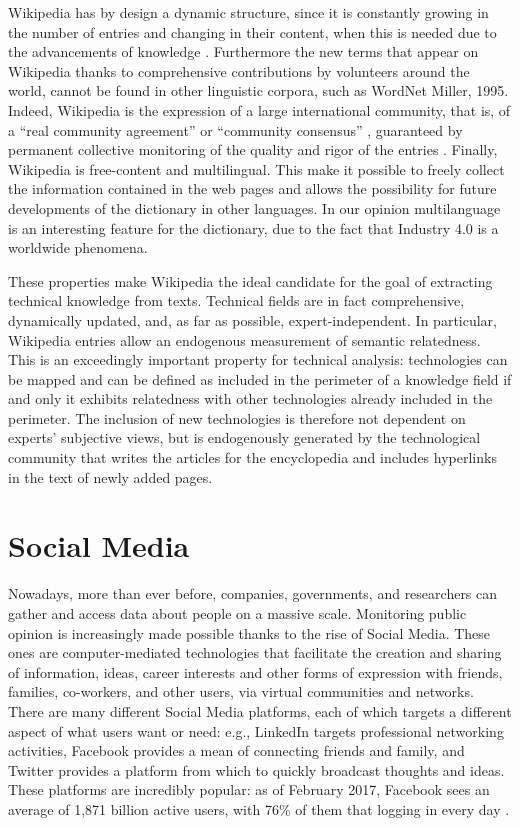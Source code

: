 \documentclass[]{book}
\begin{document}
Wikipedia has by design a dynamic structure, since it is constantly
growing in the number of entries and changing in their content, when
this is needed due to the advancements of knowledge
\citep{ponzetto2007knowledge}. Furthermore the new terms that appear on
Wikipedia thanks to comprehensive contributions by volunteers around the
world, cannot be found in other linguistic corpora, such as WordNet
Miller, 1995. Indeed, Wikipedia is the expression of a large
international community, that is, of a ``real community agreement''
\citep{bizer2009dbpedia} or ``community consensus''
\citep{hepp2007harvesting}, guaranteed by permanent collective
monitoring of the quality and rigor of the entries
\citep{bryant2005becoming}. Finally, Wikipedia is free-content and
multilingual. This make it possible to freely collect the information
contained in the web pages and allows the possibility for future
developments of the dictionary in other languages. In our opinion
multilanguage is an interesting feature for the dictionary, due to the
fact that Industry 4.0 is a worldwide phenomena.

These properties make Wikipedia the ideal candidate for the goal of
extracting technical knowledge from texts. Technical fields are in fact
comprehensive, dynamically updated, and, as far as possible,
expert-independent. In particular, Wikipedia entries allow an endogenous
measurement of semantic relatedness. This is an exceedingly important
property for technical analysis: technologies can be mapped and can be
defined as included in the perimeter of a knowledge field if and only it
exhibits relatedness with other technologies already included in the
perimeter. The inclusion of new technologies is therefore not dependent
on experts' subjective views, but is endogenously generated by the
technological community that writes the articles for the encyclopedia
and includes hyperlinks in the text of newly added pages.

\section{Social Media}\label{sotadocumentstwitter}

Nowadays, more than ever before, companies, governments, and researchers
can gather and access data about people on a massive scale. Monitoring
public opinion is increasingly made possible thanks to the rise of
Social Media. These ones are computer-mediated technologies that
facilitate the creation and sharing of information, ideas, career
interests and other forms of expression with friends, families,
co-workers, and other users, via virtual communities and networks. There
are many different Social Media platforms, each of which targets a
different aspect of what users want or need: e.g., LinkedIn targets
professional networking activities, Facebook provides a mean of
connecting friends and family, and Twitter provides a platform from
which to quickly broadcast thoughts and ideas. These platforms are
incredibly popular: as of February 2017, Facebook sees an average of
1,871 billion active users, with 76\% of them that logging in every day
\citep{tuten2017social}.
\end{document}
